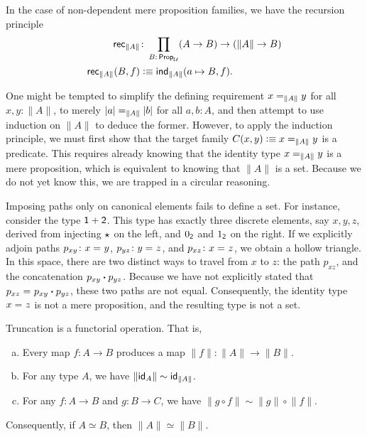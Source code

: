 In the case of non-dependent mere proposition families, we have the recursion principle
\begin{align}\label{eq:rec-truncation}
    \fun{rec}_{\lVert A\rVert}&\colon
        \prod_{B\colon\fun{Prop}_\univ}(A\to B)\to(\lVert A\rVert\to B)\\
    \fun{rec}_{\lVert A\rVert}(B,f)&\defeq\fun{ind}_{\lVert A\rVert}
        (a\mapsto B,f).\nonumber
\end{align}

\begin{rem}
    One might be tempted to simplify the defining requirement $x\mathrel{=_{\lVert A\rVert}}y$ for all $x,y\colon\lVert A\rVert$, to merely $\lvert a\rvert\mathrel{=_{\lVert A\rVert}}\lvert b\rvert$ for all $a,b\colon A$, and then attempt to use induction on $\lVert A\rVert$ to deduce the former. However, to apply the induction principle, we must first show that the target family $C(x,y)\mathrel{\vcentcolon}\equiv x\mathrel{=_{\lVert A\rVert}}y$ is a predicate. This requires already knowing that the identity type $x\mathrel{=_{\lVert A\rVert}}y$ is a mere proposition, which is equivalent to knowing that $\lVert A\rVert$ is a set. Because we do not yet know this, we are trapped in a circular reasoning.

    Imposing paths only on canonical elements fails to define a set. For instance, consider the type $\mathsf{1}+\mathsf{2}$. This type has exactly three discrete elements, say $x,y,z$, derived from injecting $\mathsf{\star}$ on the left, and $0_{\mathsf{2}}$ and $1_{\mathsf{2}}$ on the right. If we explicitly adjoin paths $p_{xy}\colon x\eq{}y$, $p_{yz}\colon y\eq{}z$, and $p_{xz}\colon x\eq{}z$, we obtain a hollow triangle. In this space, there are two distinct ways to travel from $x$ to $z$: the path $p_{xz}$, and the concatenation $p_{xy}\mathbin{\boldsymbol{\cdot}} p_{yz}$. Because we have not explicitly stated that $p_{xz}\mathrel{=_{}}p_{xy}\mathbin{\boldsymbol{\cdot}} p_{yz}$, these two paths are not equal. Consequently, the identity type $x\mathrel{=_{}}z$ is not a mere proposition, and the resulting type is not a set.
\end{rem}

\begin{lem}\label{lem:truncation-functor}
    Truncation is a functorial operation. That is,
    \begin{enumerate}[a),font=\upshape]
        \item Every map $f\colon A\to B$ produces a map $\lVert f\rVert\colon\lVert A\rVert\to\lVert B\rVert$.
        \item For any type $A$, we have $\lVert\mathsf{id}_A\rVert\sim\mathsf{id}_{\lVert A\rVert}$.
        \item For any $f\colon A\to B$ and $g\colon B\to C$, we have $\lVert g\circ f\rVert\sim\lVert g\rVert\circ\lVert f\rVert$.
    \end{enumerate}
    Consequently, if $A\simeq B$, then $\lVert A\rVert\simeq\lVert B\rVert$.
\end{lem}


